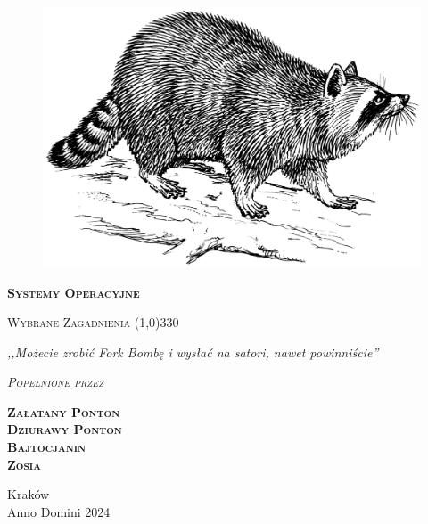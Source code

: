 \begin{titlepage} 
    \begin{center}
         \begin{figure}[h]
            \centering
			\includegraphics[scale=0.8]{img/raccoon.png}
        \end{figure}
        
        \Huge
        \textbf{\textsc{Systemy Operacyjne}}
        
        \vspace{0.5cm}
        \Large
        \textsc{Wybrane Zagadnienia}
        \line(1,0){330}
        
        \normalsize

        \vspace{1cm}
        \textit{,,Możecie zrobić Fork Bombę i wysłać na satori, nawet powinniście''}
        \vspace{1cm}

        \textit{\textsc{Popełnione przez}}\\
        \vspace{5mm}
  
        \textbf{\textsc{Załatany Ponton\\ Dziurawy Ponton \\Bajtocjanin \\ Zosia}}
 
        \vfill

        Kraków \\
        Anno Domini 2024
    \end{center}
\end{titlepage}

